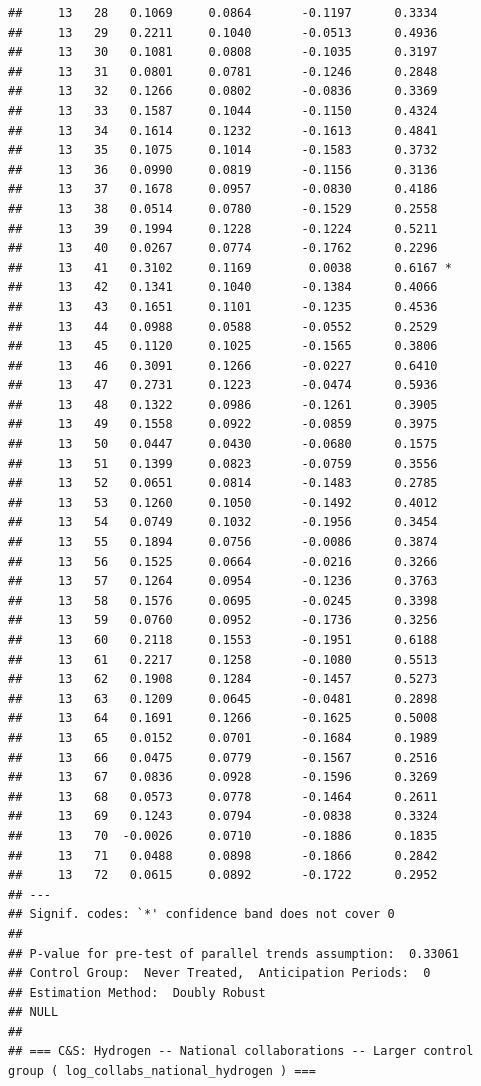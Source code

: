 \documentclass[
]{article}
\begin{document}
\begin{verbatim}
##     13   28   0.1069     0.0864       -0.1197      0.3334  
##     13   29   0.2211     0.1040       -0.0513      0.4936  
##     13   30   0.1081     0.0808       -0.1035      0.3197  
##     13   31   0.0801     0.0781       -0.1246      0.2848  
##     13   32   0.1266     0.0802       -0.0836      0.3369  
##     13   33   0.1587     0.1044       -0.1150      0.4324  
##     13   34   0.1614     0.1232       -0.1613      0.4841  
##     13   35   0.1075     0.1014       -0.1583      0.3732  
##     13   36   0.0990     0.0819       -0.1156      0.3136  
##     13   37   0.1678     0.0957       -0.0830      0.4186  
##     13   38   0.0514     0.0780       -0.1529      0.2558  
##     13   39   0.1994     0.1228       -0.1224      0.5211  
##     13   40   0.0267     0.0774       -0.1762      0.2296  
##     13   41   0.3102     0.1169        0.0038      0.6167 *
##     13   42   0.1341     0.1040       -0.1384      0.4066  
##     13   43   0.1651     0.1101       -0.1235      0.4536  
##     13   44   0.0988     0.0588       -0.0552      0.2529  
##     13   45   0.1120     0.1025       -0.1565      0.3806  
##     13   46   0.3091     0.1266       -0.0227      0.6410  
##     13   47   0.2731     0.1223       -0.0474      0.5936  
##     13   48   0.1322     0.0986       -0.1261      0.3905  
##     13   49   0.1558     0.0922       -0.0859      0.3975  
##     13   50   0.0447     0.0430       -0.0680      0.1575  
##     13   51   0.1399     0.0823       -0.0759      0.3556  
##     13   52   0.0651     0.0814       -0.1483      0.2785  
##     13   53   0.1260     0.1050       -0.1492      0.4012  
##     13   54   0.0749     0.1032       -0.1956      0.3454  
##     13   55   0.1894     0.0756       -0.0086      0.3874  
##     13   56   0.1525     0.0664       -0.0216      0.3266  
##     13   57   0.1264     0.0954       -0.1236      0.3763  
##     13   58   0.1576     0.0695       -0.0245      0.3398  
##     13   59   0.0760     0.0952       -0.1736      0.3256  
##     13   60   0.2118     0.1553       -0.1951      0.6188  
##     13   61   0.2217     0.1258       -0.1080      0.5513  
##     13   62   0.1908     0.1284       -0.1457      0.5273  
##     13   63   0.1209     0.0645       -0.0481      0.2898  
##     13   64   0.1691     0.1266       -0.1625      0.5008  
##     13   65   0.0152     0.0701       -0.1684      0.1989  
##     13   66   0.0475     0.0779       -0.1567      0.2516  
##     13   67   0.0836     0.0928       -0.1596      0.3269  
##     13   68   0.0573     0.0778       -0.1464      0.2611  
##     13   69   0.1243     0.0794       -0.0838      0.3324  
##     13   70  -0.0026     0.0710       -0.1886      0.1835  
##     13   71   0.0488     0.0898       -0.1866      0.2842  
##     13   72   0.0615     0.0892       -0.1722      0.2952  
## ---
## Signif. codes: `*' confidence band does not cover 0
## 
## P-value for pre-test of parallel trends assumption:  0.33061
## Control Group:  Never Treated,  Anticipation Periods:  0
## Estimation Method:  Doubly Robust
## NULL
## 
## === C&S: Hydrogen -- National collaborations -- Larger control group ( log_collabs_national_hydrogen ) ===
\end{verbatim}
\end{document}
